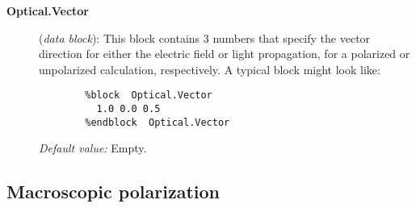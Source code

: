 \begin{description}
\item[\textbf{Optical.Vector}] (\textit{data block}):
This block contains 3 numbers that specify the vector direction
for either the electric field or light propagation, for a polarized
or unpolarized calculation, respectively. A typical block might look
like:

\begin{verbatim}
        %block  Optical.Vector
          1.0 0.0 0.5
        %endblock  Optical.Vector
\end{verbatim}

\textit{Default value:} Empty.

\end{description}

\vspace{5pt}
\subsection{Macroscopic polarization}

